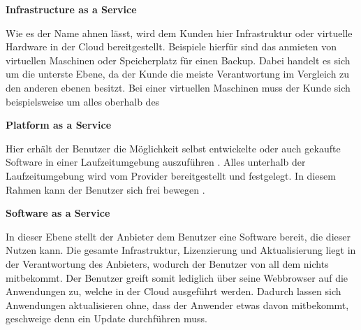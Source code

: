 \textbf{Infrastructure as a Service}

Wie es der Name ahnen lässt, wird dem Kunden hier Infrastruktur oder virtuelle Hardware in der Cloud bereitgestellt. Beispiele hierfür sind das anmieten von virtuellen Maschinen oder Speicherplatz für einen Backup.\cite*[]{DAAS} Dabei handelt es sich um die unterste Ebene, da der Kunde die meiste Verantwortung im Vergleich zu den anderen ebenen besitzt. Bei einer virtuellen Maschinen muss der Kunde sich beispielsweise um alles oberhalb des

\textbf{Platform as a Service}

Hier erhält der Benutzer die Möglichkeit selbst entwickelte oder auch gekaufte Software in einer Laufzeitumgebung auszuführen \cite*[]{NIST}.
Alles unterhalb der Laufzeitumgebung wird vom Provider bereitgestellt und festgelegt. In diesem Rahmen kann der Benutzer sich frei bewegen \cite*[]{DAAS}.

\textbf{Software as a Service}

In dieser Ebene stellt der Anbieter dem Benutzer eine Software bereit, die dieser Nutzen kann. Die gesamte Infrastruktur, Lizenzierung und Aktualisierung liegt in der Verantwortung des Anbieters, wodurch der Benutzer von all dem nichts mitbekommt. Der Benutzer greift somit lediglich über seine Webbrowser auf die Anwendungen zu, welche in der Cloud ausgeführt werden. Dadurch lassen sich Anwendungen aktualisieren ohne, dass der Anwender etwas davon mitbekommt, geschweige denn ein Update durchführen muss. \cite*[]{NIST}